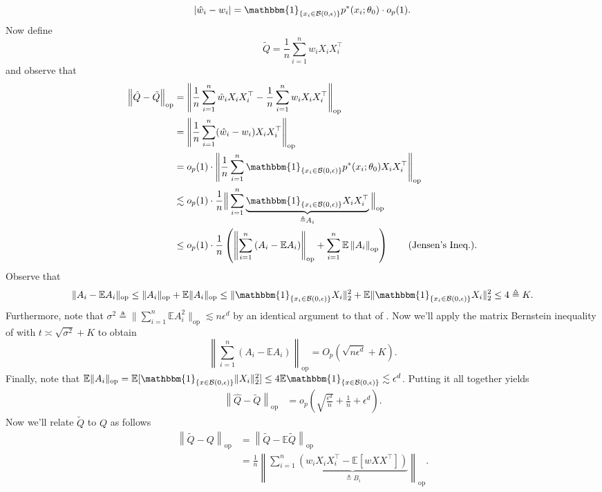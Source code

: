 \documentclass[11pt]{article}
\begin{document}
\begin{equation*}
     |\hat{w}_i - w_i| = \mathbbm{1}_{\{x_i \in \mathcal{B}(0, \epsilon)\}}p^*(x_i;\theta_0) \cdot o_p(1).
\end{equation*}
Now define 
\[\tilde{Q} = \frac{1}{n}\sum_{i = 1}^n w_iX_iX_i^{\top}\]
and observe that 
\begin{align*}
\left\|\hat{Q} - \tilde{Q}\right\|_{\text{op}} &= \left\|\frac{1}{n}\sum_{i = 1}^n\hat{w}_iX_iX_i^{\top} - \frac{1}{n}\sum_{i = 1}^nw_iX_iX_i^{\top}\right\|_{\text{op}} \\
&= \left\|\frac{1}{n}\sum_{i = 1}^n(\hat{w}_i - w_i)X_iX_i^{\top}\right\|_{\text{op}} \\
&= o_p(1) \cdot \left\|\frac{1}{n}\sum_{i = 1}^n\mathbbm{1}_{\{x_i \in \mathcal{B}(0, \epsilon)\}}p^*(x_i;\theta_0)X_iX_i^{\top}\right\|_{\text{op}} \\
&\lesssim  o_p(1) \cdot \frac{1}{n}\Big\|\sum_{i = 1}^n\underbrace{\mathbbm{1}_{\{x_i \in \mathcal{B}(0, \epsilon)\}}X_iX_i^{\top}}_{\triangleq A_i}\Big\|_{\text{op}} \\
&\leq o_p(1) \cdot \frac{1}{n}\left(\left\|\sum_{i = 1}^n\left(A_i - \mathbb{E}A_i\right)\right\|_{\text{op}} + \sum_{i = 1}^n\mathbb{E}\left\|A_i\right\| _{\text{op}}\right)\tag{Jensen's Ineq.} .
\end{align*}
Observe that \[\|A_i - \mathbb{E}A_i\|_{\text{op}} \leq \|A_i\|_{\text{op}} + \mathbb{E}\|A_i\|_{\text{op}} \leq \|\mathbbm{1}_{\{x_i \in \mathcal{B}(0, \epsilon)\}}X_i\|^2_2 + \mathbb{E}\|\mathbbm{1}_{\{x_i \in \mathcal{B}(0, \epsilon)\}}X_i\|_2^2 \leq 4 \triangleq K.\] Furthermore, note that $\sigma^2 \triangleq \|\sum_{i = 1}^n\mathbb{E}A_i^2\|_{\text{op}} \lesssim n\epsilon^d$ by an identical argument to that of . Now we'll apply the matrix Bernstein inequality of  with $t \asymp \sqrt{\sigma^2} + K$ to obtain
\[\left\| \sum_{i = 1}^n \left(A_i - \mathbb{E}A_i\right)\right\|_{\text{op}} = O_p\left(\sqrt{n\epsilon^d}  + K\right).\]
Finally, note that $\mathbb{E}\|A_i\|_{\text{op}} = \mathbb{E}[\mathbbm{1}_{\{x \in \mathcal{B}(0, \epsilon)\}}\|X_i\|_2^2] \leq 4\mathbb{E}\mathbbm{1}_{\{x \in \mathcal{B}(0, \epsilon)\}} \lesssim \epsilon^d$. Putting it all together yields
\begin{align*}
\left\|\hat{Q} - \tilde{Q}\right\|_{\text{op}} &= o_p\left( \sqrt{\frac{\epsilon^d}{n}} + \frac{1}{n} + \epsilon^d \right).
\end{align*}
Now we'll relate $\tilde Q$ to $Q$ as follows
\begin{align*}
    \left\|\tilde{Q} - Q\right\|_{\text{op}} &= \left\|\tilde{Q} - \mathbb{E}\tilde{Q}\right\|_{\text{op}} \\
    &= \frac{1}{n}\left\|\sum_{i = 1}^n\underbrace{\left(w_iX_iX_i^{\top} - \mathbb{E}[wXX^{\top}]\right)}_{\triangleq B_i}\right\|_{\text{op}}.
\end{align*}
\end{document}
